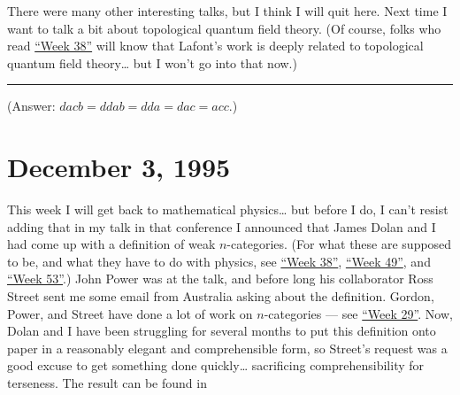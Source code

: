 \documentclass{article}
\renewcommand{\texttt}[1]{%
  \begingroup
  \ttfamily
  \begingroup\lccode`~=`/\lowercase{\endgroup\def~}{/\discretionary{}{}{}}%
  \begingroup\lccode`~=`[\lowercase{\endgroup\def~}{[\discretionary{}{}{}}%
  \begingroup\lccode`~=`.\lowercase{\endgroup\def~}{.\discretionary{}{}{}}%
  \catcode`/=\active\catcode`[=\active\catcode`.=\active
  \scantokens{#1\noexpand}%
  \endgroup
}
\begin{document}

There were many other interesting talks, but I think I will quit here.
Next time I want to talk a bit about topological quantum field theory.
(Of course, folks who read \protect\hyperlink{week38}{``Week 38''} will
know that Lafont's work is deeply related to topological quantum field
theory\ldots{} but I won't go into that now.)

\begin{center}\rule{0.5\linewidth}{0.5pt}\end{center}

(Answer: \(dacb = ddab = dda = dac = acc\).)



\hypertarget{week71}{%
\section{December 3, 1995}\label{week71}}

This week I will get back to mathematical physics\ldots{} but before I
do, I can't resist adding that in my talk in that conference I announced
that James Dolan and I had come up with a definition of weak
\(n\)-categories. (For what these are supposed to be, and what they have
to do with physics, see \protect\hyperlink{week38}{``Week 38''},
\protect\hyperlink{week49}{``Week 49''}, and
\protect\hyperlink{week53}{``Week 53''}.) John Power was at the talk,
and before long his collaborator Ross Street sent me some email from
Australia asking about the definition. Gordon, Power, and Street have
done a lot of work on \(n\)-categories --- see
\protect\hyperlink{week29}{``Week 29''}. Now, Dolan and I have been
struggling for several months to put this definition onto paper in a
reasonably elegant and comprehensible form, so Street's request was a
good excuse to get something done quickly\ldots{} sacrificing
comprehensibility for terseness. The result can be found in
\end{document}
